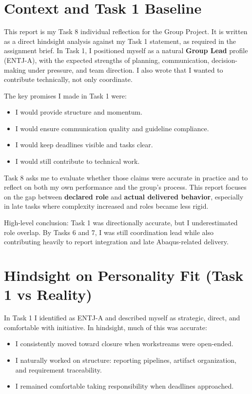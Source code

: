 
\chapter{Context and Task 1 Baseline}


\noindent This report is my Task 8 individual reflection for the Group Project. It is written as a direct hindsight analysis against my Task 1 statement, as required in the assignment brief. In Task 1, I positioned myself as a natural \textbf{Group Lead} profile (ENTJ-A), with the expected strengths of planning, communication, decision-making under pressure, and team direction. I also wrote that I wanted to contribute technically, not only coordinate.


\noindent The key promises I made in Task 1 were:

\begin{itemize}[leftmargin=1.5em]
\item I would provide structure and momentum.
\item I would ensure communication quality and guideline compliance.
\item I would keep deadlines visible and tasks clear.
\item I would still contribute to technical work.
\end{itemize}

\noindent Task 8 asks me to evaluate whether those claims were accurate in practice and to reflect on both my own performance and the group's process. This report focuses on the gap between \textbf{declared role} and \textbf{actual delivered behavior}, especially in late tasks where complexity increased and roles became less rigid.

\noindent High-level conclusion: Task 1 was directionally accurate, but I underestimated role overlap. By Tasks 6 and 7, I was still coordination lead while also contributing heavily to report integration and late Abaqus-related delivery.


\chapter{Hindsight on Personality Fit (Task 1 vs Reality)}


\noindent In Task 1 I identified as ENTJ-A and described myself as strategic, direct, and comfortable with initiative. In hindsight, much of this was accurate:

\begin{itemize}[leftmargin=1.5em]
\item I consistently moved toward closure when workstreams were open-ended.
\item I naturally worked on structure: reporting pipelines, artifact organization, and requirement traceability.
\item I remained comfortable taking responsibility when deadlines approached.
\end{itemize}

